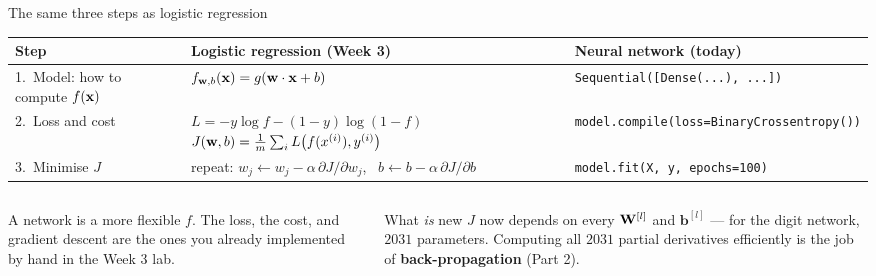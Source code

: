 \documentclass[aspectratio=169,10pt]{beamer}
\begin{document}
\begin{frame}{The same three steps as logistic regression}
  \footnotesize
  \renewcommand{\arraystretch}{1.35}
  \begin{tabular}{@{}L{2.2cm}L{4.9cm}L{6.1cm}@{}}
    \toprule
    Step & Logistic regression (Week 3) & Neural network (today)\\
    .\ Model: how to compute $f(\mathbf{x})$
      & $f_{\mathbf{w},b}(\mathbf{x})=g(\mathbf{w}\cdot\mathbf{x}+b)$
      & \texttt{Sequential([Dense(...), ...])}\\
    2.\ Loss and cost
      & $L=-y\log f-(1-y)\log(1-f)$\newline $J(\mathbf{w},b)=\frac1m\sum_i L\bigl(f(x^{(i)}),y^{(i)}\bigr)$
      & \texttt{model.compile(loss=BinaryCrossentropy())}\\
    3.\ Minimise $J$
      & repeat: $w_j \leftarrow w_j-\alpha\,\partial J/\partial w_j$, \ $b\leftarrow b-\alpha\,\partial J/\partial b$
      & \texttt{model.fit(X, y, epochs=100)}\\
    \bottomrule
  \end{tabular}
  \vspace{3mm}
  \begin{columns}[T,onlytextwidth]
    \begin{column}{0.5\textwidth}
      \begin{keyidea}
        A network is a more flexible $f$. The loss, the cost, and gradient descent are the
        ones you already implemented by hand in the Week 3 lab.
      \end{keyidea}
    \end{column}
    \begin{column}{0.46\textwidth}
      \begin{block}{What \emph{is} new}
        $J$ now depends on every $\mathbf{W}^{[l]}$ and $\mathbf{b}^{[l]}$ --- for the digit
        network, $2031$ parameters. Computing all $2031$ partial derivatives efficiently is
        the job of \textbf{back-propagation} (Part 2).
      \end{block}
    \end{column}
  \end{columns}
\end{frame}
\end{document}
